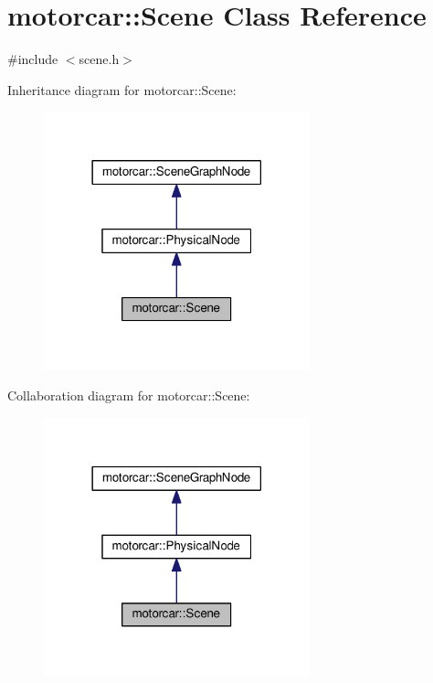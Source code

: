 \hypertarget{classmotorcar_1_1Scene}{\section{motorcar\-:\-:Scene Class Reference}
\label{classmotorcar_1_1Scene}
}


{\ttfamily \#include $<$scene.\-h$>$}



Inheritance diagram for motorcar\-:\-:Scene\-:
\nopagebreak
\begin{figure}[H]
\begin{center}
\leavevmode
\includegraphics[width=218pt]{classmotorcar_1_1Scene__inherit__graph}
\end{center}
\end{figure}


Collaboration diagram for motorcar\-:\-:Scene\-:
\nopagebreak
\begin{figure}[H]
\begin{center}
\leavevmode
\includegraphics[width=218pt]{classmotorcar_1_1Scene__coll__graph}
\end{center}
\end{figure}
